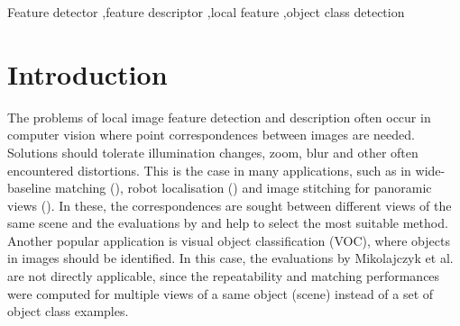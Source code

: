 \documentclass[preprint,authoryear,review]{elsarticle}
\newcommand{\commentNK}[1]{{\bf NK: #1}}
\begin{document}
\begin{frontmatter}
\begin{abstract}
%

\end{abstract}

\begin{keyword}
Feature detector \sep feature descriptor \sep local feature \sep object class detection


\end{keyword}

\end{frontmatter}


%
\section{Introduction}
%
The problems of local image feature detection and description often occur
in computer vision where point correspondences between images are needed.
Solutions should tolerate illumination changes, zoom, blur and other
often encountered distortions. This is the case in many
applications, such as in wide-baseline matching (\cite{TuyGoo:2004}), robot
localisation (\cite{SeLowLit:2002}) and image stitching for panoramic
views (\cite{BroLow:2003}). In these, the correspondences are sought
between different views of the same scene and the evaluations by
\cite{MikTuySch:2005} and \cite{MikSch:2005} help to select the
most suitable method. Another popular application is visual object
classification (VOC), where objects in images should be identified.
In this case, the evaluations by Mikolajczyk et al.
are not
directly applicable, since the repeatability and matching performances
were computed for multiple views of a same object (scene) instead of
a set of object class examples.
\end{document}
